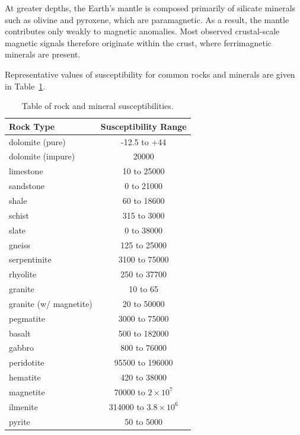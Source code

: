 At greater depths, the Earth's mantle is composed primarily of silicate minerals such as olivine and pyroxene, which are paramagnetic. As a result, the mantle contributes only weakly to magnetic anomalies. Most observed crustal-scale magnetic signals therefore originate within the crust, where ferrimagnetic minerals are present.

Representative values of susceptibility for common rocks and minerals are given in Table~\ref{tab-chi}.
\begin{table}
    \centering
    \begin{threeparttable}
    \caption{Table of rock and mineral susceptibilities.}
    \label{tab-chi}
    \begin{tabular}{lc}
        \toprule
        \textbf{Rock Type} & 
        \textbf{Susceptibility Range} \\
        \midrule
        dolomite (pure)   & -12.5 to +44 \\
        dolomite (impure) & 20000 \\
        limestone         & 10 to 25000 \\
        sandstone         & 0 to 21000  \\
        shale             & 60 to 18600 \\
        schist            & 315 to 3000 \\
        slate             & 0 to 38000 \\
        gneiss            & 125 to 25000 \\
        serpentinite      & 3100 to 75000 \\
        rhyolite          & 250 to 37700 \\
        granite           & 10 to 65 \\
        granite (w/ magnetite) & 20 to 50000 \\
        pegmatite         & 3000 to 75000 \\
        basalt            & 500 to 182000 \\
        gabbro            & 800 to 76000 \\
        peridotite        & 95500 to 196000 \\
        hematite          & 420 to 38000 \\
        magnetite         & 70000 to $2 \times 10^{7}$ \\
        ilmenite          & 314000 to $3.8 \times 10^{6}$ \\
        pyrite            & 50 to 5000 \\

\end{tabular}
\end{threeparttable}
\end{table}

